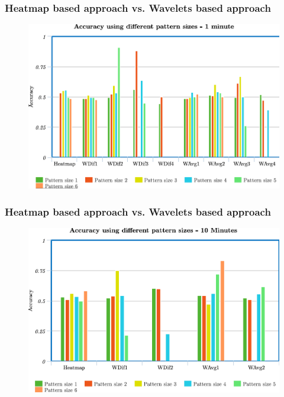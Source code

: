 \documentclass{beamer}
\begin{document}
\begin{frame}
\frametitle{Heatmap based approach vs. Wavelets based approach}

\begin{figure}
	\centering
		\includegraphics[scale=0.3]{chart1.png}
	\label{fig:chart1}
\end{figure}
\end{frame}

\begin{frame}
\frametitle{Heatmap based approach vs. Wavelets based approach}

\begin{figure}
	\centering
		\includegraphics[scale=0.3]{chart2.png}
	\label{fig:chart2}
\end{figure}
\end{frame}
\end{document}
